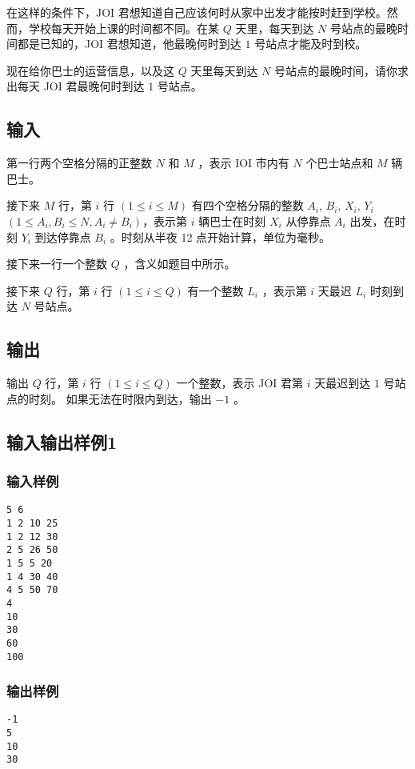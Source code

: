 \documentclass[UTF8]{ctexart}
\begin{document}
在这样的条件下，JOI 君想知道自己应该何时从家中出发才能按时赶到学校。然而，学校每天开始上课的时间都不同。在某 $Q$ 天里，每天到达 $N$ 号站点的最晚时间都是已知的，JOI 君想知道，他最晚何时到达 $1$ 号站点才能及时到校。

现在给你巴士的运营信息，以及这 $Q$ 天里每天到达 $N$ 号站点的最晚时间，请你求出每天 JOI 君最晚何时到达 $1$ 号站点。

\subsection{输入}

第一行两个空格分隔的正整数 $N$ 和 $M$ ，表示 IOI 市内有 $N$ 个巴士站点和 $M$ 辆巴士。

接下来 $M$ 行，第 $i$ 行 $(1\le i\le M)$ 有四个空格分隔的整数 $A_i$, $B_i$, $X_i$, $Y_i$ $(1\le A_i,B_i\le N, A_i\neq B_i)$，表示第 $i$ 辆巴士在时刻 $X_i$ 从停靠点 $A_i$ 出发，在时刻 $Y_i$ 到达停靠点 $B_i$ 。时刻从半夜 12 点开始计算，单位为毫秒。

接下来一行一个整数 $Q$ ，含义如题目中所示。

接下来 $Q$ 行，第 $i$ 行 $(1\le i\le Q)$ 有一个整数 $L_i$ ，表示第 $i$ 天最迟 $L_i$ 时刻到达 $N$ 号站点。

\subsection{输出}

输出 $Q$ 行，第 $i$ 行 $(1\le i\le Q)$ 一个整数，表示 JOI 君第 $i$ 天最迟到达 $1$ 号站点的时刻。 如果无法在时限内到达，输出 $-1$ 。

\subsection{输入输出样例1}


\subsubsection{输入样例}

\begin{lstlisting}
5 6
1 2 10 25
1 2 12 30
2 5 26 50
1 5 5 20
1 4 30 40
4 5 50 70
4
10
30
60
100
\end{lstlisting}


\subsubsection{输出样例}

\begin{lstlisting}
-1
5
10
30
\end{lstlisting}
\end{document}
